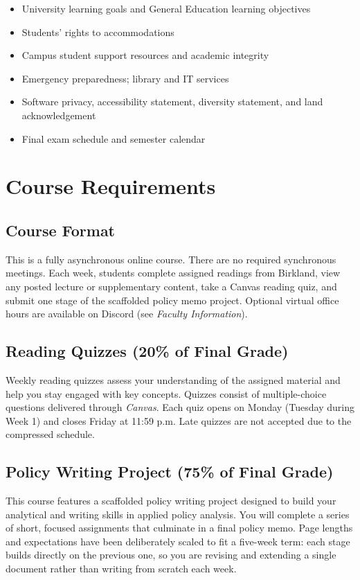 \documentclass[12pt]{article}
\begin{document}
\begin{itemize}
\item University learning goals and General Education learning objectives
\item Students' rights to accommodations
\item Campus student support resources and academic integrity
\item Emergency preparedness; library and IT services
\item Software privacy, accessibility statement, diversity statement, and land acknowledgement
\item Final exam schedule and semester calendar
\end{itemize}

\section*{Course Requirements}

\subsection*{Course Format}
This is a fully asynchronous online course. There are no required synchronous meetings. Each week, students complete assigned readings from Birkland, view any posted lecture or supplementary content, take a Canvas reading quiz, and submit one stage of the scaffolded policy memo project. Optional virtual office hours are available on Discord (see \emph{Faculty Information}).

\subsection*{Reading Quizzes (20\% of Final Grade)}
Weekly reading quizzes assess your understanding of the assigned material and help you stay engaged with key concepts. Quizzes consist of multiple-choice questions delivered through \emph{Canvas}. Each quiz opens on Monday (Tuesday during Week 1) and closes Friday at 11:59 p.m. Late quizzes are not accepted due to the compressed schedule.

\subsection*{Policy Writing Project (75\% of Final Grade)}
This course features a scaffolded policy writing project designed to build your analytical and writing skills in applied policy analysis. You will complete a series of short, focused assignments that culminate in a final policy memo. Page lengths and expectations have been deliberately scaled to fit a five-week term: each stage builds directly on the previous one, so you are revising and extending a single document rather than writing from scratch each week.
\end{document}
